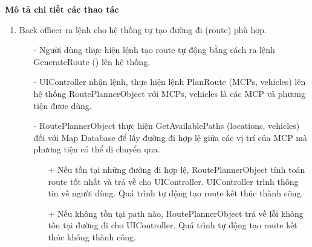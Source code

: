         \textbf{Mô tả chi tiết các thao tác}
        \begin{enumerate}
            \item Back officer ra lệnh cho hệ thống tự tạo đường đi (route) phù hợp.
            \begin{itemize}
                \item[-] Người dùng thực hiện lệnh tạo route tự động bằng cách ra lệnh GenerateRoute () lên hệ thống.
                \item[-] UIController nhận lệnh, thực hiện lệnh PlanRoute (MCPs, vehicles) lên hệ thống RoutePlannerObject với MCPs, vehicles là các MCP và phương tiện được dùng.
                \item[-] RoutePlannerObject thực hiện GetAvailablePaths (locations, vehicles) đối với Map Database để lấy đường đi hợp lệ giữa các vị trí của MCP mà phương tiện có thể di chuyển qua.
                \begin{itemize}
                    \item[+] Nếu tồn tại những đường đi hợp lệ, RoutePlannerObject tính toán route tốt nhất và trả về cho UIController. UIController trình thông tin về người dùng. Quá trình tự động tạo route kết thúc thành công.
                    \item[+] Nếu không tồn tại path nào, RoutePlannerObject trả về lỗi không tồn tại đường đi cho UIController. Quá trình tự động tạo route kết thúc không thành công.
                \end{itemize}
            \end{itemize}


\end{enumerate}
